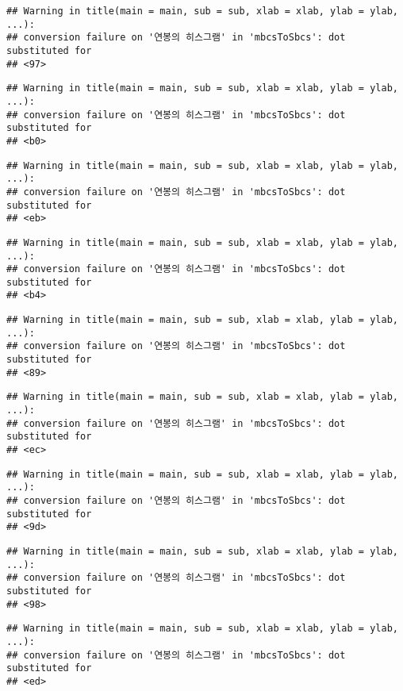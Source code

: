 \documentclass[
]{article}
\begin{document}
\begin{verbatim}
## Warning in title(main = main, sub = sub, xlab = xlab, ylab = ylab, ...):
## conversion failure on '연봉의 히스그램' in 'mbcsToSbcs': dot substituted for
## <97>
\end{verbatim}

\begin{verbatim}
## Warning in title(main = main, sub = sub, xlab = xlab, ylab = ylab, ...):
## conversion failure on '연봉의 히스그램' in 'mbcsToSbcs': dot substituted for
## <b0>
\end{verbatim}

\begin{verbatim}
## Warning in title(main = main, sub = sub, xlab = xlab, ylab = ylab, ...):
## conversion failure on '연봉의 히스그램' in 'mbcsToSbcs': dot substituted for
## <eb>
\end{verbatim}

\begin{verbatim}
## Warning in title(main = main, sub = sub, xlab = xlab, ylab = ylab, ...):
## conversion failure on '연봉의 히스그램' in 'mbcsToSbcs': dot substituted for
## <b4>
\end{verbatim}

\begin{verbatim}
## Warning in title(main = main, sub = sub, xlab = xlab, ylab = ylab, ...):
## conversion failure on '연봉의 히스그램' in 'mbcsToSbcs': dot substituted for
## <89>
\end{verbatim}

\begin{verbatim}
## Warning in title(main = main, sub = sub, xlab = xlab, ylab = ylab, ...):
## conversion failure on '연봉의 히스그램' in 'mbcsToSbcs': dot substituted for
## <ec>
\end{verbatim}

\begin{verbatim}
## Warning in title(main = main, sub = sub, xlab = xlab, ylab = ylab, ...):
## conversion failure on '연봉의 히스그램' in 'mbcsToSbcs': dot substituted for
## <9d>
\end{verbatim}

\begin{verbatim}
## Warning in title(main = main, sub = sub, xlab = xlab, ylab = ylab, ...):
## conversion failure on '연봉의 히스그램' in 'mbcsToSbcs': dot substituted for
## <98>
\end{verbatim}

\begin{verbatim}
## Warning in title(main = main, sub = sub, xlab = xlab, ylab = ylab, ...):
## conversion failure on '연봉의 히스그램' in 'mbcsToSbcs': dot substituted for
## <ed>
\end{verbatim}
\end{document}
